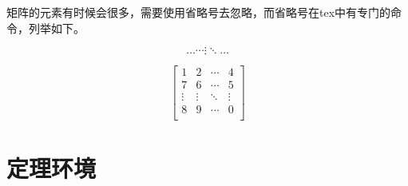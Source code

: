 矩阵的元素有时候会很多，需要使用省略号去忽略，而省略号在tex中有专门的命令，列举如下。
\begin{codeshow}
\[
\ldots \cdots \vdots \ddots \dotsc
\]
\end{codeshow}

\begin{codeshow}
\[\begin{bmatrix}
 1      & 2      & \cdots & 4      \\
 7      & 6      & \cdots & 5      \\
 \vdots & \vdots & \ddots & \vdots \\
 8      & 9      & \cdots & 0      \\
\end{bmatrix}\]
\end{codeshow}


\section{定理环境}